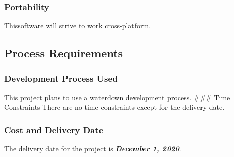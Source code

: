 \documentclass[12pt]{article}
\begin{document}
\subsubsection{Portability }
Thissoftware will strive to work cross-platform. 

\subsection{Process Requirements}

\subsubsection{Development Process Used}\label{development-process-used}

This project plans to use a waterdown development process. \#\#\# Time
Constraints There are no time constraints except for the delivery date.
\subsubsection{ Cost and Delivery Date}
 The delivery date for the project is
\textbf{\emph{December 1, 2020}}.
\end{document}
